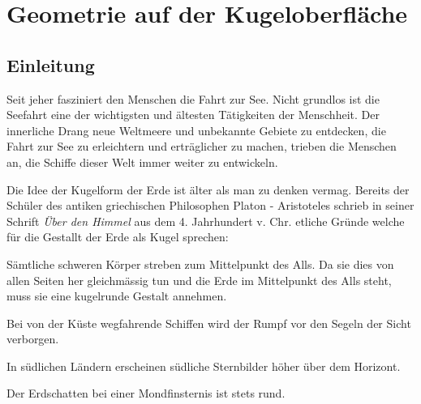 \chapter{Geometrie auf der Kugeloberfläche\label{chapter:kugel}}
\begin{refsection}

\section{Einleitung}

Seit jeher fasziniert den Menschen die Fahrt zur See. Nicht grundlos ist die Seefahrt eine der wichtigsten und ältesten Tätigkeiten der Menschheit. Der innerliche Drang neue Weltmeere und unbekannte Gebiete zu entdecken, die Fahrt zur See zu erleichtern und erträglicher zu machen, trieben die Menschen an, die Schiffe dieser Welt immer weiter zu entwickeln.

Die Idee der Kugelform der Erde ist älter als man zu denken vermag. Bereits der Schüler des antiken griechischen Philosophen Platon - Aristoteles schrieb in seiner Schrift \textit{Über den Himmel} aus dem 4. Jahrhundert v. Chr. etliche Gründe welche für die Gestallt der Erde als Kugel sprechen:\\

\begin{compactitem}
      \item Sämtliche schweren Körper streben zum Mittelpunkt des Alls. Da sie dies von allen Seiten her gleichmässig tun und die Erde im Mittelpunkt des Alls steht, muss sie eine kugelrunde Gestalt annehmen. 
\item Bei von der Küste wegfahrende Schiffen wird der Rumpf vor den Segeln der Sicht verborgen. 
\item In südlichen Ländern erscheinen südliche Sternbilder höher über dem Horizont.
\item Der Erdschatten bei einer Mondfinsternis ist stets rund.
\end{compactitem}



\end{refsection}
